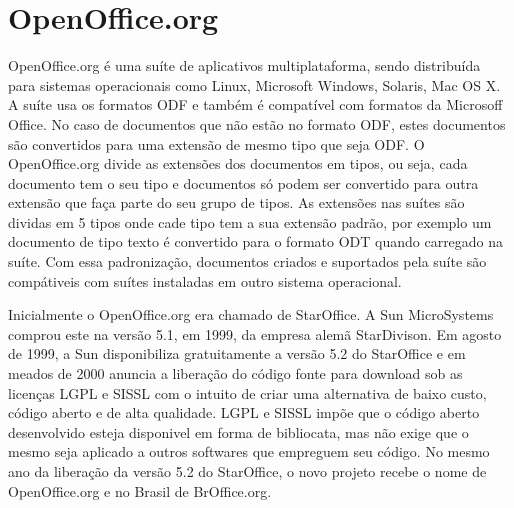 \section{OpenOffice.org}
\label{openoffice}
OpenOffice.org é uma suíte de aplicativos multiplataforma, sendo distribuída para sistemas operacionais como Linux, Microsoft Windows, Solaris, Mac OS X. A suíte usa os formatos ODF e também é compatível com formatos da Microsoff Office. No caso de documentos que não estão no formato ODF, estes documentos são convertidos para uma extensão de mesmo tipo que seja ODF. O OpenOffice.org divide as extensões dos documentos em tipos, ou seja, cada documento tem o seu tipo e documentos só podem ser convertido para outra extensão que faça parte do seu grupo de tipos. As extensões nas suítes são dividas em 5 tipos onde cade tipo tem a sua extensão padrão, por exemplo um documento de tipo texto é convertido para o formato ODT quando carregado na suíte. Com essa padronização, documentos criados e suportados pela suíte são compátiveis com suítes instaladas em outro sistema operacional.

Inicialmente o OpenOffice.org era chamado de StarOffice. A Sun MicroSystems comprou este na versão 5.1, em 1999, da empresa alemã StarDivison. Em agosto de 1999, a Sun disponibiliza gratuitamente a versão 5.2 do StarOffice e em meados de 2000 anuncia a liberação do código fonte para download sob as licenças LGPL e SISSL com o intuito de criar uma alternativa de baixo custo, código aberto e de alta qualidade. LGPL e SISSL impõe que o código aberto desenvolvido esteja disponivel em forma de bibliocata, mas não exige que o mesmo seja aplicado a outros softwares que empreguem seu código. No mesmo ano da liberação da versão 5.2 do StarOffice, o novo projeto recebe o nome de OpenOffice.org e no Brasil de BrOffice.org.